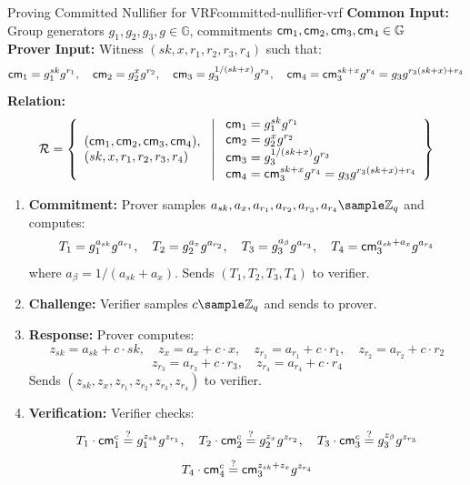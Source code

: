 \begin{protocol}{Proving Committed Nullifier for VRF}{committed-nullifier-vrf}\label{pok-committed-nullifier-vrf}
\textbf{Common Input:} Group generators $g_1, g_2, g_3, g \in \mathbb{G}$, commitments $\mathsf{cm}_1, \mathsf{cm}_2, \mathsf{cm}_3, \mathsf{cm}_4 \in \mathbb{G}$ \\
\textbf{Prover Input:} Witness $(sk, x, r_1, r_2, r_3, r_4)$ such that:
    \[
    \mathsf{cm}_1 = g_1^{sk} g^{r_1}, \quad \mathsf{cm}_2 = g_2^{x} g^{r_2}, \quad \mathsf{cm}_3 = g_3^{1/(sk + x)} g^{r_3}, \quad \mathsf{cm}_4 = \mathsf{cm}_3^{sk + x} g^{r_4} = g_3 g^{r_3 (sk + x) + r_4}
    \]
\textbf{Relation:}
\[
\mathcal{R} = \left\{ 
\begin{array}{l} 
(\mathsf{cm}_1, \mathsf{cm}_2, \mathsf{cm}_3, \mathsf{cm}_4), \\
(sk, x, r_1, r_2, r_3, r_4) 
\end{array}
\ \middle| \
\begin{array}{l}
\mathsf{cm}_1 = g_1^{sk} g^{r_1} \\
\mathsf{cm}_2 = g_2^{x} g^{r_2} \\
\mathsf{cm}_3 = g_3^{1/(sk + x)} g^{r_3} \\
\mathsf{cm}_4 = \mathsf{cm}_3^{sk + x} g^{r_4} = g_3 g^{r_3 (sk + x) + r_4}
\end{array} \right\}
\]
\begin{enumerate}
    \item \textbf{Commitment:} Prover samples $a_{sk}, a_x, a_{r_1}, a_{r_2}, a_{r_3}, a_{r_4} \sample \mathbb{Z}_q$ and computes:
       \[
       T_1 = g_1^{a_{sk}} g^{a_{r_1}}, \quad T_2 = g_2^{a_x} g^{a_{r_2}}, \quad T_3 = g_3^{a_{\beta}} g^{a_{r_3}}, \quad T_4 = \mathsf{cm}_3^{a_{sk} + a_x} g^{a_{r_4}}
       \]
       where $a_{\beta} = 1/(a_{sk} + a_x)$. Sends $(T_1, T_2, T_3, T_4)$ to verifier.
    
    \item \textbf{Challenge:} Verifier samples $c \sample \mathbb{Z}_q$ and sends to prover.
    
    \item \textbf{Response:} Prover computes:
       \[
       z_{sk} = a_{sk} + c \cdot sk, \quad z_x = a_x + c \cdot x, \quad z_{r_1} = a_{r_1} + c \cdot r_1, \quad z_{r_2} = a_{r_2} + c \cdot r_2
       \]
       \[
       z_{r_3} = a_{r_3} + c \cdot r_3, \quad z_{r_4} = a_{r_4} + c \cdot r_4
       \]
       Sends $(z_{sk}, z_x, z_{r_1}, z_{r_2}, z_{r_3}, z_{r_4})$ to verifier.
    
    \item \textbf{Verification:} Verifier checks:
       \[
       T_1 \cdot \mathsf{cm}_1^c \stackrel{?}{=} g_1^{z_{sk}} g^{z_{r_1}}, \quad T_2 \cdot \mathsf{cm}_2^c \stackrel{?}{=} g_2^{z_x} g^{z_{r_2}}, \quad T_3 \cdot \mathsf{cm}_3^c \stackrel{?}{=} g_3^{z_{\beta}} g^{z_{r_3}}
       \]
       \[
       T_4 \cdot \mathsf{cm}_4^c \stackrel{?}{=} \mathsf{cm}_3^{z_{sk} + z_x} g^{z_{r_4}}
       \]
\end{enumerate}
\end{protocol}

